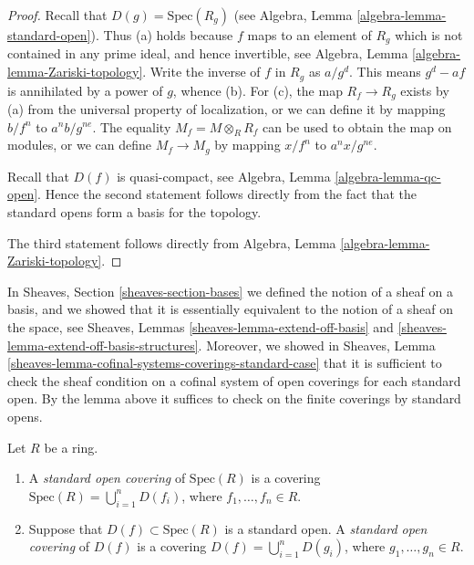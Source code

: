 \begin{proof}
Recall that $D(g) = \text{Spec}(R_g)$ (see
Algebra, Lemma \ref{algebra-lemma-standard-open}).
Thus (a) holds because $f$
maps to an element of $R_g$ which is not
contained in any prime ideal, and hence invertible,
see Algebra, Lemma \ref{algebra-lemma-Zariski-topology}.
Write the inverse of $f$ in $R_g$ as $a/g^d$.
This means $g^d - af$ is annihilated by a power of $g$, whence (b).
For (c), the map $R_f \to R_g$ exists by (a) from the universal property
of localization, or we can define it by mapping $b/f^n$
to $a^nb/g^{ne}$. The equality $M_f = M \otimes_R R_f$
can be used to obtain the map on modules, or
we can define $M_f \to M_g$ by mapping
$x/f^n$ to $a^nx/g^{ne}$.

\medskip\noindent
Recall that $D(f)$ is quasi-compact, see 
Algebra, Lemma \ref{algebra-lemma-qc-open}.
Hence the second statement follows directly
from the fact that the standard opens form
a basis for the topology.

\medskip\noindent
The third statement follows directly from
Algebra, Lemma \ref{algebra-lemma-Zariski-topology}.
\end{proof}

\noindent
In Sheaves, Section \ref{sheaves-section-bases} we defined
the notion of a sheaf on a basis, and we showed that it is
essentially equivalent to the notion of a sheaf on the space,
see Sheaves, Lemmas \ref{sheaves-lemma-extend-off-basis} and
\ref{sheaves-lemma-extend-off-basis-structures}. Moreover,
we showed in
Sheaves, Lemma \ref{sheaves-lemma-cofinal-systems-coverings-standard-case}
that it is sufficient to check the sheaf
condition on a cofinal system of open coverings for each
standard open. By the lemma above it suffices to check
on the finite coverings by standard opens.

\begin{definition}
\label{definition-standard-covering}
Let $R$ be a ring.
\begin{enumerate}
\item A {\it standard open covering} of $\text{Spec}(R)$
is a covering $\text{Spec}(R) = \bigcup_{i=1}^n D(f_i)$,
where $f_1,\ldots, f_n \in R$.
\item Suppose that $D(f) \subset \text{Spec}(R)$ is a standard
open. A {\it standard open covering} of $D(f)$
is a covering $D(f) = \bigcup_{i=1}^n D(g_i)$,
where $g_1,\ldots, g_n \in R$.
\end{enumerate}
\end{definition}

